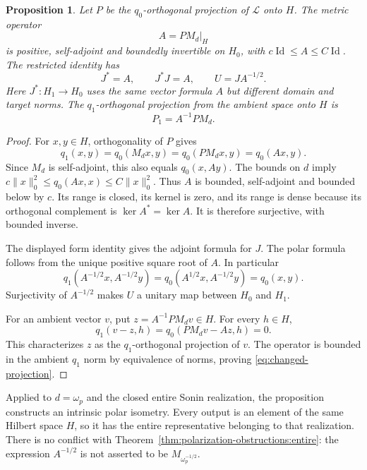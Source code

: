 \documentclass[11pt,letterpaper]{article}
\newtheorem{proposition}[theorem]{Proposition}
\theoremstyle{definition}
\theoremstyle{remark}
\newcommand{\Id}{\operatorname{Id}}
\begin{document}
\begin{proposition}
\label{prop:polarization-obstructions:compression}
Let $P$ be the $q_0$-orthogonal projection of $\mathcal L$ onto
$H$. The metric operator
\begin{equation}
 A=P M_d|_H
 \label{eq:compressed-metric}
\end{equation}
is positive, self-adjoint and boundedly invertible on $H_0$, with
$c\Id\leq A\leq C\Id$. The restricted identity has
\begin{equation}
 J^*=A,\qquad J^*J=A,\qquad U=JA^{-1/2}.
 \label{eq:intrinsic-polar}
\end{equation}
Here $J^*:H_1\to H_0$ uses the same vector formula $A$ but
different domain and target norms. The $q_1$-orthogonal
projection from the ambient space onto $H$ is
\begin{equation}
 P_1=A^{-1}PM_d.
 \label{eq:changed-projection}
\end{equation}
\end{proposition}
\begin{proof}
For $x,y\in H$, orthogonality of $P$ gives
\[
 q_1(x,y)=q_0(M_dx,y)=q_0(PM_dx,y)=q_0(Ax,y).
\]
Since $M_d$ is self-adjoint, this also equals $q_0(x,Ay)$.
The bounds on $d$ imply
$c\|x\|_0^2\leq q_0(Ax,x)\leq C\|x\|_0^2$.
Thus $A$ is bounded, self-adjoint and bounded below by $c$.
Its range is closed, its kernel is zero, and its range is dense
because its orthogonal complement is $\ker A^*=\ker A$.
It is therefore surjective, with bounded inverse.

The displayed form identity gives the adjoint formula for $J$.
The polar formula follows from the unique positive square root
of $A$. In particular
\[
 q_1(A^{-1/2}x,A^{-1/2}y)
 =q_0(A^{1/2}x,A^{-1/2}y)=q_0(x,y).
\]
Surjectivity of $A^{-1/2}$ makes $U$ a unitary map between
$H_0$ and $H_1$.

For an ambient vector $v$, put $z=A^{-1}PM_dv\in H$.
For every $h\in H$,
\[
 q_1(v-z,h)=q_0(PM_dv-Az,h)=0.
\]
This characterizes $z$ as the $q_1$-orthogonal projection of
$v$. The operator is bounded in the ambient $q_1$ norm by
equivalence of norms, proving \eqref{eq:changed-projection}.
\end{proof}

Applied to $d=\omega_p$ and the closed entire Sonin realization, the
proposition constructs an intrinsic polar isometry. Every output
is an element of the same Hilbert space $H$, so it has the
entire representative belonging to that realization. There is no
conflict with Theorem~\ref{thm:polarization-obstructions:entire}:
the expression $A^{-1/2}$ is not asserted to be $M_{\omega_p^{-1/2}}$.
\end{document}
